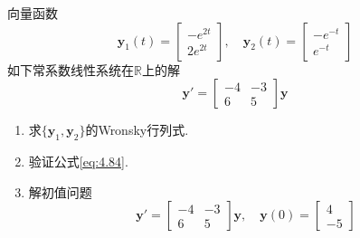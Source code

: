 \begin{example}
    向量函数
    \[
        \mathbf{y}_1(t)=\begin{bmatrix}
            -e^{2t} \\
            2e^{2t}
        \end{bmatrix},\quad
        \mathbf{y}_2(t)=\begin{bmatrix}
            -e^{-t} \\
            e^{-t}
        \end{bmatrix}
    \]
    如下常系数线性系统在$\mathbb{R}$上的解
    \[
        \mathbf{y}'=\begin{bmatrix}
            -4 & -3 \\
            6  & 5
        \end{bmatrix}\mathbf{y}
    \]
    \begin{enumerate}[label=\alph*)]
        \item 求$\{\mathbf{y}_1,\mathbf{y}_2\}$的Wronsky行列式.
        \item 验证公式\ref{eq:4.84}.
        \item 解初值问题
              \begin{equation}\label{eq:4.86}
                  \mathbf{y}'=\begin{bmatrix}
                      -4 & -3 \\
                      6  & 5
                  \end{bmatrix}\mathbf{y},\quad \mathbf{y}(0)=\begin{bmatrix}
                      4 \\
                      -5
                  \end{bmatrix}
              \end{equation}
    \end{enumerate}
\end{example}

